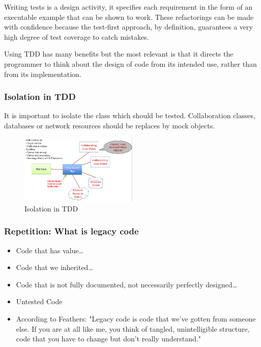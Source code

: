 \begin{tcolorbox}[colback=red!5!white,colframe=red!75!black]
Writing tests is a design activity, it specifies each requirement in the form of an executable example that can be shown to work. These refactorings can be made with confidence because the test-first approach, by definition, guarantees a very high degree of test coverage to catch mistakes.
\end{tcolorbox}

\begin{tcolorbox}[colback=red!5!white,colframe=red!75!black]
Using TDD has many benefits but the most relevant is that it directs the programmer to think about the design of code from its intended use, rather than from its implementation.
\end{tcolorbox}

\hypertarget{isolation-in-tdd}{%
\subsubsection{Isolation in TDD}\label{isolation-in-tdd}}

It is important to isolate the class which should be tested.
Collaboration classes, databases or network resources should be replaces
by mock objects.

\begin{figure}[H]
\centering
\includegraphics[width=0.5\textwidth]{figures/tdd_mocks.png}
\caption{Isolation in TDD}
\end{figure}

\hypertarget{repetition-what-is-legacy-code}{%
\subsubsection{Repetition: What is legacy
code}\label{repetition-what-is-legacy-code}}

\begin{itemize}
\tightlist
\item
  Code that has value\ldots{}
\item
  Code that we inherited\ldots{}
\item
  Code that is not fully documented, not necessarily perfectly
  designed\ldots{}
\item
  Untested Code
\item
  According to Feathers: "Legacy code is code that we've gotten from someone else. If you are at all like me, you think of tangled, unintelligible structure, code that you have to change but don't really understand."
\end{itemize}

